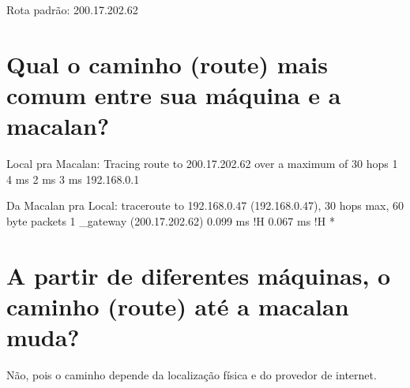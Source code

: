 \documentclass{article}
\begin{document}
Rota padrão: 200.17.202.62

\section{Qual o caminho (route) mais comum entre sua máquina e a macalan?}

Local pra Macalan:
Tracing route to 200.17.202.62 over a maximum of 30 hops
  1     4 ms     2 ms     3 ms  192.168.0.1
  
Da Macalan pra Local:
traceroute to 192.168.0.47 (192.168.0.47), 30 hops max, 60 byte packets
 1  _gateway (200.17.202.62)  0.099 ms !H  0.067 ms !H *
\section{A partir de diferentes máquinas, o caminho (route) até a macalan muda?}

Não, pois o caminho depende da localização física e do provedor de internet.
\end{document}
